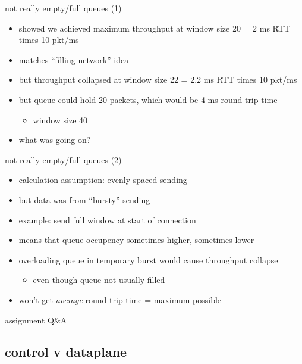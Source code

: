 \begin{frame}{not really empty/full queues (1)}
    \begin{itemize}
    \item showed we achieved maximum throughput at window size 20 = 2 ms RTT times 10 pkt/ms
    \item matches ``filling network'' idea
    \vspace{.5cm}
    \item<2-> but throughput collapsed at window size 22 = 2.2 ms RTT times 10 pkt/ms
    \item<2-> but queue could hold 20 packets, which would be 4 ms round-trip-time
        \begin{itemize}
        \item window size 40
        \end{itemize}
    \item<2-> what was going on?
    \end{itemize}
\end{frame}

\begin{frame}{not really empty/full queues (2)}
    \begin{itemize}
    \item calculation assumption: evenly spaced sending
    \item but data was from ``bursty'' sending
    \item example: send full window at start of connection
    \vspace{.5cm}
    \item means that queue occupency sometimes higher, sometimes lower
    \vspace{.5cm}
    \item overloading queue in temporary burst would cause throughput collapse
        \begin{itemize}
        \item even though queue not usually filled
        \end{itemize}
    \item won't get \textit{average} round-trip time = maximum possible
    \end{itemize}
\end{frame}

\begin{frame}{assignment Q\&A}
\end{frame}

\subsection{control v dataplane}


